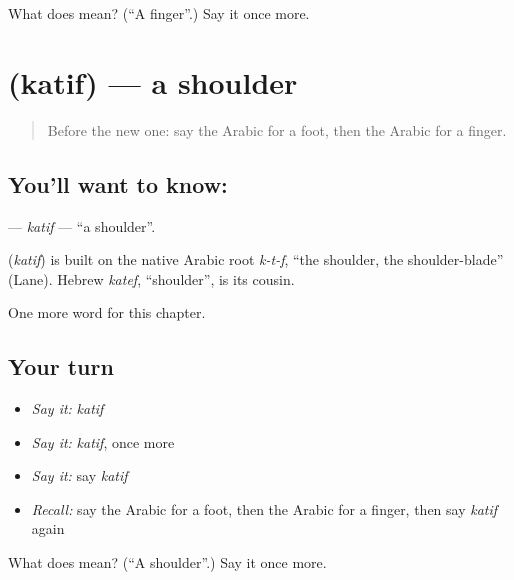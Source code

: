 \begin{tcolorbox}[breakable,colback=teal!4,colframe=teal!35!black,title={Before you move on}]
What does  mean? (\textquotedblleft{}A finger\textquotedblright{}.) Say it once more.
\end{tcolorbox}
\section[\texorpdfstring{\ar{كتف} (katif)}{كتف (katif)}]{ (katif) — a shoulder}

\label{lesson:AR-C51-katif}



\begin{quote}
Before the new one: say the Arabic for a foot, then the Arabic for a finger.
\end{quote}

\subsection*{You'll want to know: }
\textbf{} — \emph{katif} — \textquotedblleft{}a shoulder\textquotedblright{}.

\begin{cousinweb}
\textbf{} (\emph{katif}) is built on the native Arabic root \emph{k-t-f}, \textquotedblleft{}the shoulder, the shoulder-blade\textquotedblright{} (Lane). Hebrew \emph{katef}, \textquotedblleft{}shoulder\textquotedblright{}, is its cousin.
\end{cousinweb}

\begin{grammarlens}[title={What you've built}]
One more word for this chapter.
\end{grammarlens}

\subsection*{Your turn}
\begin{itemize}
\raggedright
  \item \emph{Say it:} \emph{katif}
  \item \emph{Say it:} \emph{katif}, once more
  \item \emph{Say it:} say \emph{katif}
  \item \emph{Recall:} say the Arabic for a foot, then the Arabic for a finger, then say \emph{katif} again
\end{itemize}

\begin{tcolorbox}[breakable,colback=teal!4,colframe=teal!35!black,title={Before you move on}]
What does  mean? (\textquotedblleft{}A shoulder\textquotedblright{}.) Say it once more.
\end{tcolorbox}
